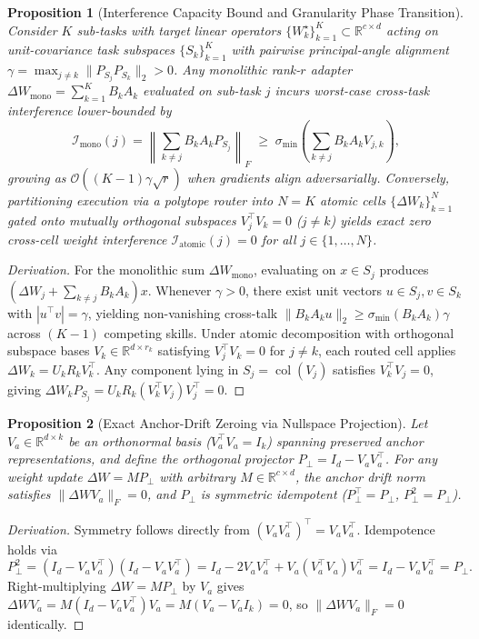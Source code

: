 \documentclass[11pt,a4paper]{article}
\newtheorem{proposition}{Proposition}
\begin{document}
\begin{proposition}[Interference Capacity Bound and Granularity Phase Transition]
\label{prop:interference}
Consider $K$ sub-tasks with target linear operators $\{W_k^\star\}_{k=1}^K \subset \mathbb{R}^{c \times d}$ acting on unit-covariance task subspaces $\{S_k\}_{k=1}^K$ with pairwise principal-angle alignment $\gamma = \max_{j \neq k} \|P_{S_j} P_{S_k}\|_2 > 0$. Any monolithic rank-$r$ adapter $\Delta W_{\text{mono}} = \sum_{k=1}^K B_k A_k$ evaluated on sub-task $j$ incurs worst-case cross-task interference lower-bounded by
\begin{equation}
\mathcal{I}_{\text{mono}}(j) = \left\| \sum_{k \neq j} B_k A_k P_{S_j} \right\|_F \;\ge\; \sigma_{\min}\!\left(\sum_{k \neq j} B_k A_k V_{j,k}\right),
\end{equation}
growing as $\mathcal{O}((K-1)\gamma \sqrt{r})$ when gradients align adversarially. Conversely, partitioning execution via a polytope router into $N = K$ atomic cells $\{\Delta W_k\}_{k=1}^N$ gated onto mutually orthogonal subspaces $V_j^\top V_k = 0$ ($j \neq k$) yields exact zero cross-cell weight interference $\mathcal{I}_{\text{atomic}}(j) = 0$ for all $j \in \{1,\dots,N\}$.
\end{proposition}
\begin{proof}[Derivation]
For the monolithic sum $\Delta W_{\text{mono}}$, evaluating on $x \in S_j$ produces $(\Delta W_j + \sum_{k \neq j} B_k A_k) x$. Whenever $\gamma > 0$, there exist unit vectors $u \in S_j, v \in S_k$ with $|u^\top v| = \gamma$, yielding non-vanishing cross-talk $\|B_k A_k u\|_2 \ge \sigma_{\min}(B_k A_k)\gamma$ across $(K-1)$ competing skills. Under atomic decomposition with orthogonal subspace bases $V_k \in \mathbb{R}^{d \times r_k}$ satisfying $V_j^\top V_k = 0$ for $j \neq k$, each routed cell applies $\Delta W_k = U_k R_k V_k^\top$. Any component lying in $S_j = \operatorname{col}(V_j)$ satisfies $V_k^\top V_j = 0$, giving $\Delta W_k P_{S_j} = U_k R_k (V_k^\top V_j) V_j^\top = 0$.
\end{proof}

\begin{proposition}[Exact Anchor-Drift Zeroing via Nullspace Projection]
\label{prop:nullspace}
Let $V_a \in \mathbb{R}^{d \times k}$ be an orthonormal basis ($V_a^\top V_a = I_k$) spanning preserved anchor representations, and define the orthogonal projector $P_\perp = I_d - V_a V_a^\top$. For any weight update $\Delta W = M P_\perp$ with arbitrary $M \in \mathbb{R}^{c \times d}$, the anchor drift norm satisfies $\|\Delta W V_a\|_F = 0$, and $P_\perp$ is symmetric idempotent ($P_\perp^\top = P_\perp$, $P_\perp^2 = P_\perp$).
\end{proposition}
\begin{proof}[Derivation]
Symmetry follows directly from $(V_a V_a^\top)^\top = V_a V_a^\top$. Idempotence holds via
\[
P_\perp^2 = (I_d - V_a V_a^\top)(I_d - V_a V_a^\top) = I_d - 2 V_a V_a^\top + V_a (V_a^\top V_a) V_a^\top = I_d - V_a V_a^\top = P_\perp.
\]
Right-multiplying $\Delta W = M P_\perp$ by $V_a$ gives $\Delta W V_a = M (I_d - V_a V_a^\top) V_a = M (V_a - V_a I_k) = 0$, so $\|\Delta W V_a\|_F = 0$ identically.
\end{proof}
\end{document}
